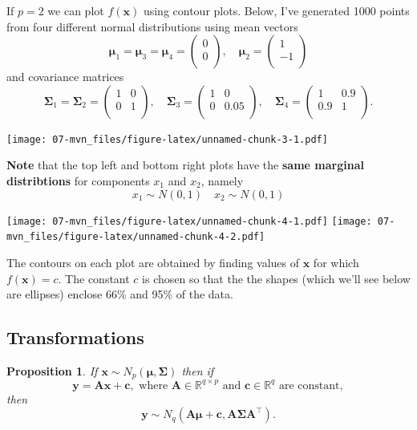 \documentclass[
]{book}
\newtheorem{proposition}{Proposition}[chapter]
\theoremstyle{definition}
\theoremstyle{definition}
\theoremstyle{definition}
\theoremstyle{definition}
\theoremstyle{remark}
\begin{document}
If \(p=2\) we can plot \(f(\mathbf x)\) using contour plots. Below, I've generated 1000 points from four different normal distributions using mean vectors
\[{\boldsymbol{\mu}}_1={\boldsymbol{\mu}}_3={\boldsymbol{\mu}}_4=\begin{pmatrix}0 \\0 \\\end{pmatrix}, \quad {\boldsymbol{\mu}}_2=\begin{pmatrix}1 \\-1 \\\end{pmatrix}\]
and covariance matrices
\[\boldsymbol{\Sigma}_1=\boldsymbol{\Sigma}_2=\begin{pmatrix}1&0 \\0&1 \\\end{pmatrix}, \quad \boldsymbol{\Sigma}_3=\begin{pmatrix}1&0 \\0&0.05 \\\end{pmatrix}, \quad \boldsymbol{\Sigma}_4=\begin{pmatrix}1&0.9 \\0.9&1 \\\end{pmatrix}.\]

\texttt{[image: 07-mvn\_files/figure-latex/unnamed-chunk-3-1.pdf]}

\textbf{Note} that the top left and bottom right plots have the \textbf{same marginal distribtions} for components \(x_1\) and \(x_2\), namely
\[x_1 \sim N(0, 1)\quad x_2 \sim N(0, 1)\]

\texttt{[image: 07-mvn\_files/figure-latex/unnamed-chunk-4-1.pdf]} \texttt{[image: 07-mvn\_files/figure-latex/unnamed-chunk-4-2.pdf]}

The contours on each plot are obtained by finding values of \(\mathbf x\) for which \(f(\mathbf x)=c\). The constant \(c\) is chosen so that the the shapes (which we'll see below are ellipses)
enclose 66\% and 95\% of the data.

\subsection{Transformations}\label{transformations}

\begin{proposition}
\protect\hypertarget{prp:six2}{}\label{prp:six2}If \(\mathbf x\sim N_p({\boldsymbol{\mu}},\boldsymbol{\Sigma})\) then if \[\mathbf y= \mathbf A\mathbf x+ \mathbf c, \mbox{ where } \mathbf A\in \mathbb{R}^{q \times p} \mbox{ and }\mathbf c\in \mathbb{R}^q
  \mbox{ are constant},\] then
\[\mathbf y\sim N_q(\mathbf A{\boldsymbol{\mu}}+ \mathbf c, \mathbf A\boldsymbol{\Sigma}\mathbf A^\top).\]
\end{proposition}
\end{document}
